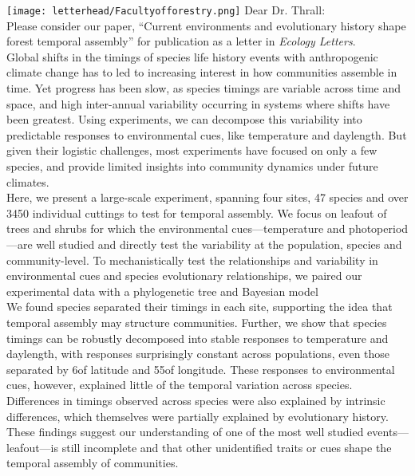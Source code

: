 \documentclass[11pt,a4paper]{article}
\begin{document}

\noindent \texttt{[image: letterhead/Facultyofforestry.png]}
\noindent Dear Dr. Thrall:
\vspace{1.5ex}\\
\noindent Please consider our paper, ``Current environments and evolutionary history shape forest temporal assembly'' for publication as a letter in \emph{Ecology Letters}. 
\vspace{1.5ex}\\ 
Global shifts in the timings of species life history events with anthropogenic climate change has to led to increasing interest in how communities assemble in time. Yet progress has been slow, as species timings are variable across time and space, and high inter-annual variability occurring in systems where shifts have been greatest. Using experiments, we can decompose this variability into predictable responses to environmental cues, like temperature and daylength. But given their logistic challenges, most experiments have focused on only a few species, and provide limited insights into community dynamics under future climates. %
\vspace{1.5ex}\\
\noindent 
Here, we present a large-scale experiment, spanning four sites, 47 species and over 3450 individual cuttings to test for temporal assembly.  We focus on leafout of trees and shrubs for which the environmental cues---temperature and photoperiod---are well studied and directly test the variability at the population, species and community-level. To mechanistically test the relationships and variability in environmental cues and species evolutionary relationships, we paired our experimental data with a phylogenetic tree and Bayesian model 
\vspace{1.5ex}\\
\noindent  
We found species separated their timings in each site, supporting the idea that temporal assembly may structure communities. Further, we show that species timings can be robustly decomposed into stable responses to temperature and daylength, with responses surprisingly constant across populations, even those separated by 6\textdegree of latitude and 55\textdegree of longitude. These responses to environmental cues, however, explained little of the temporal variation across species. Differences in timings observed across species were also explained by intrinsic differences, which themselves were partially explained by evolutionary history. These findings suggest our understanding of one of the most well studied events---leafout---is still incomplete and that other unidentified traits or cues shape the temporal assembly of communities. 
\end{document}
